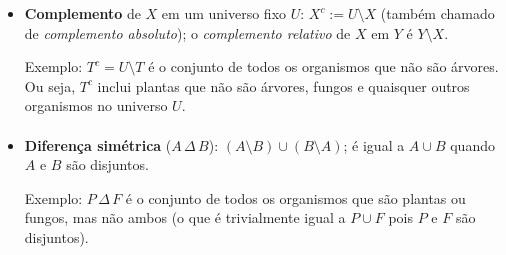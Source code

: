\documentclass[12pt,a4paper]{article}
\begin{document}
\begin{itemize}
    \paragraph{}
    \item \textbf{Complemento} de \(X\) em um universo fixo \(U\): \(X^c := U\setminus X\) (também chamado de \textit{complemento absoluto}); o \textit{complemento relativo} de \(X\) em \(Y\) é \(Y\setminus X\).
    
    Exemplo: \(T^c = U \setminus T\) é o conjunto de todos os organismos que não são árvores. Ou seja, \(T^c\) inclui plantas que não são árvores, fungos e quaisquer outros organismos no universo \(U\).
    \begin{center}
    \label{fig:op-complemento}
    \end{center}

    \paragraph{}
    \item \textbf{Diferença simétrica} (\(A\,\Delta\, B\)): \((A\setminus B)\cup(B\setminus A)\); é igual a \(A\cup B\) quando \(A\) e \(B\) são disjuntos.
    
    Exemplo: \(P\,\Delta\, F\) é o conjunto de todos os organismos que são plantas ou fungos, mas não ambos (o que é trivialmente igual a \(P \cup F\) pois \(P\) e \(F\) são disjuntos).
    \begin{center}
    \label{fig:op-dif-simetrica}
    \end{center}


\end{itemize}
\end{document}
